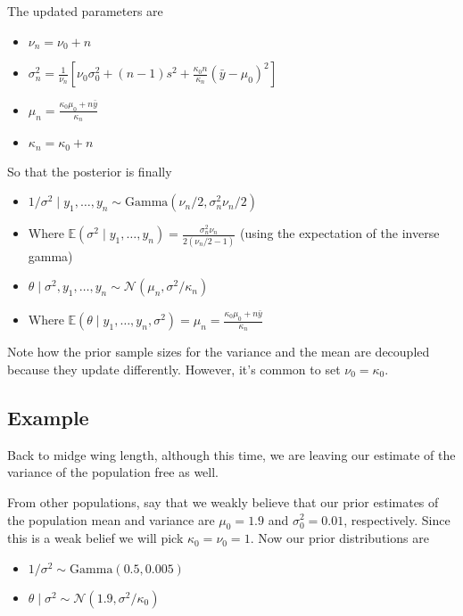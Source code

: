 \documentclass[]{article}
\providecommand{\tightlist}{%
  \setlength{\itemsep}{0pt}\setlength{\parskip}{0pt}}
\begin{document}
The updated parameters are

\begin{itemize}
\tightlist
\item
  \(\nu_n = \nu_0 + n\)
\item
  \(\sigma_n^2 = \frac{1}{\nu_n} \left[ \nu_0 \sigma_0^2 + (n - 1)s^2 + \frac{\kappa_0 n}{\kappa_n} (\bar{y} - \mu_0)^2 \right]\)
\item
  \(\mu_n = \frac{\kappa_0 \mu_0 + n\bar{y}}{\kappa_n}\)
\item
  \(\kappa_n = \kappa_0 + n\)
\end{itemize}

So that the posterior is finally

\begin{itemize}
\tightlist
\item
  \(1 / \sigma^2 \mid y_1, \dots, y_n \sim \text{Gamma}(\nu_n / 2, \sigma^2_n \nu_n / 2)\)
\item
  Where
  \(\mathbb{E}(\sigma^2 \mid y_1, \dots, y_n) = \frac{\sigma^2_n \nu_n}{2 (\nu_n / 2 - 1)}\)
  (using the expectation of the inverse gamma)
\item
  \(\theta \mid \sigma^2, y_1, \dots, y_n \sim \mathcal{N}(\mu_n, \sigma^2 / \kappa_n)\)
\item
  Where
  \(\mathbb{E}(\theta \mid y_1, \dots, y_n, \sigma^2) = \mu_n = \frac{\kappa_0 \mu_0 + n \bar{y}}{\kappa_n}\)
\end{itemize}

Note how the prior sample sizes for the variance and the mean are
decoupled because they update differently. However, it's common to set
\(\nu_0 = \kappa_0\).

\hypertarget{example}{%
\subsection{Example}\label{example}}

Back to midge wing length, although this time, we are leaving our
estimate of the variance of the population free as well.

From other populations, say that we weakly believe that our prior
estimates of the population mean and variance are \(\mu_0 = 1.9\) and
\(\sigma_0^2 = 0.01\), respectively. Since this is a weak belief we will
pick \(\kappa_0 = \nu_0 = 1\). Now our prior distributions are

\begin{itemize}
\tightlist
\item
  \(1 / \sigma^2 \sim \text{Gamma}(0.5, 0.005)\)
\item
  \(\theta \mid \sigma^2 \sim \mathcal{N}(1.9, \sigma^2 / \kappa_0)\)
\end{itemize}
\end{document}
